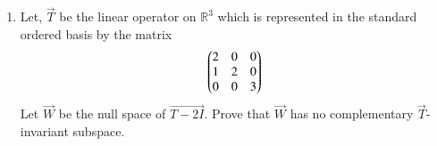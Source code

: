 \renewcommand{\theequation}{\theenumi}
\renewcommand{\thefigure}{\theenumi}
\begin{enumerate}[label=\thesubsection.\arabic*.,ref=\thesubsection.\theenumi]

\item Let, $\vec{T}$ be the linear operator on $\mathbb{R}^3$ which is represented in the standard ordered
basis by the matrix
\begin{align}
	\begin{pmatrix}2 & 0 & 0 \\ 1 & 2 & 0 \\ 0 & 0 & 3\end{pmatrix}
\end{align}
Let $\vec{W}$ be the null space of $\vec{T-2I}$. Prove that $\vec{W}$ has no complementary $\vec{T}$-invariant
subspace.
%
\\
\solution

\end{enumerate}
